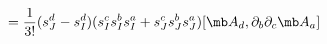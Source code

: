 \begin{equation}
[L_2^{(1)},L_1^{(3)}-L_3^{(3)}]= \frac{1}{3!}( s_{J}^{d}- s_{I}^{d})  ( s_{I}^{c}s_{I}^{b}s_{I}^{a}+s_{J}^{c} s_{J}^{b} s_{J}^{a})[ {\mb A}_d,\partial_b\partial_c{\mb A}_a]
\end{equation}

